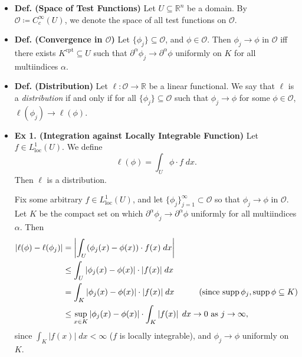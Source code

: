 \documentclass{article}
\begin{document}
\begin{itemize}
	\item \textbf{Def. (Space of Test Functions)} Let $U \subseteq \mathbb{R}^{n}$ be a domain. By $\mathcal{O} \coloneqq C_{c}^{\infty}(U)$, we denote the space of all test functions on $\mathcal{O}$. 
	\item \textbf{Def. (Convergence in $\mathcal{O}$)} Let $\{\phi_{j}\} \subseteq \mathcal{O}$, and $\phi \in \mathcal{O}$. Then $\phi_{j} \to \phi$ in $\mathcal{O}$ iff there exists $K^{\text{cpt}} \subseteq U$ such that $\partial^{\alpha}\phi_{j} \to \partial^{\alpha}\phi$ uniformly on $K$ for all multiindices $\alpha$. 
	\item \textbf{Def. (Distribution)} Let $\ell: \mathcal{O} \to \mathbb{R}$ be a linear functional. We say that $\ell$ is a \textit{distribution} if and only if for all $\{\phi_{j}\} \subseteq \mathcal{O}$ such that $\phi_{j} \to\phi$ for some $\phi \in \mathcal{O}$, $\ell(\phi_{j}) \to \ell(\phi)$. 
	
	\item \textbf{Ex 1. (Integration against Locally Integrable Function)} Let $f \in L^{1}_{\text{loc}}(U)$. We define 
		\begin{equation}
			\ell(\phi)= \int_{U}\phi \cdot f\;dx. 
		\end{equation}
	Then $\ell$ is a distribution. 
	
	{\color{orange}
		Fix some arbitrary $f \in L^{1}_{\text{loc}}(U)$, and let $\{\phi_{j}\}_{j = 1}^{\infty} \subset \mathcal{O}$ so that $\phi_{j} \to \phi$ in $\mathcal{O}$. Let $K$ be the compact set on which $\partial^{\alpha}\phi_{j} \to \partial^{\alpha}\phi$ uniformly for all multiindices $\alpha$. Then 
			\begin{align}
				\begin{split}
					\left| \ell(\phi) - \ell(\phi_{j}) \right| &= \left| \int_{U}(\phi_{j}(x) - \phi(x))\cdot f(x)\;dx \right| \\
					&\leq \int_{U}|\phi_{j}(x) - \phi(x)|\cdot |f(x)|\;dx \\
					&= \int_{K}|\phi_{j}(x) - \phi(x)|\cdot |f(x)|\;dx \qquad \quad \text{(since $\operatorname{supp}{\phi_{j}}, \operatorname{supp}{\phi} \subseteq K$)}\\
					&\leq \sup_{x \in K}|\phi_{j}(x) - \phi(x)| \cdot \int_{K}\left| f(x) \right|\;dx \to 0 \text{ as $j \to \infty$}, 
				\end{split}
			\end{align}
		since $\int_{K}|f(x)|\;dx < \infty$ ($f$ is locally integrable), and $\phi_{j} \to \phi$ uniformly on $K$. 
	}
	

\end{itemize}
\end{document}
